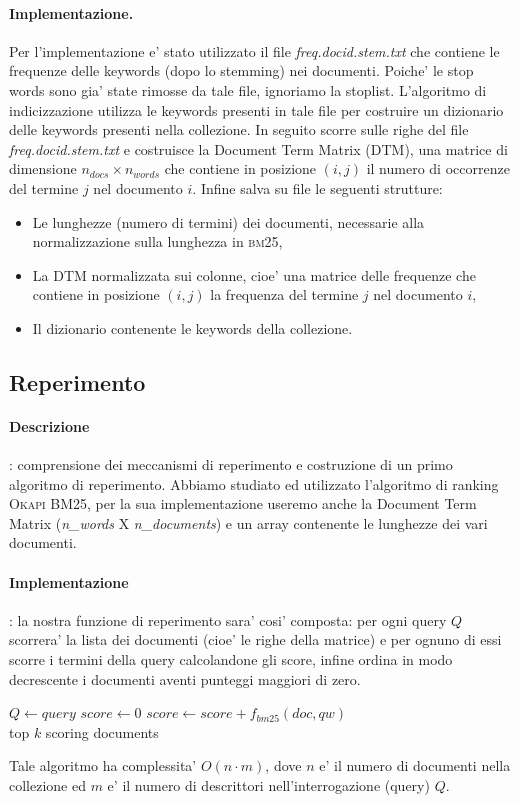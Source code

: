 \paragraph{\textbf{Implementazione.}}
Per l'implementazione e' stato utilizzato il file \textit{freq.docid.stem.txt} che contiene le frequenze delle keywords (dopo lo stemming) nei documenti. Poiche' le stop words sono gia' state rimosse da tale file, ignoriamo la stoplist.
L'algoritmo di indicizzazione utilizza le keywords presenti in tale file per costruire un dizionario delle keywords presenti nella collezione. In seguito scorre sulle righe del file \textit{freq.docid.stem.txt} e costruisce la Document Term Matrix (DTM), una matrice di  dimensione $n_{docs} \times n_{words}$ che contiene in posizione $(i,j)$ il numero di occorrenze del termine $j$ nel documento $i$. Infine salva su file le seguenti strutture:
\begin{itemize}
	\item Le lunghezze (numero di termini) dei documenti, necessarie alla normalizzazione sulla lunghezza in \textsc{bm25},
	\item La DTM normalizzata sui colonne, cioe' una matrice delle frequenze che contiene in posizione $(i,j)$ la frequenza del termine $j$ nel documento $i$,
	\item Il dizionario contenente le keywords della collezione.
\end{itemize}

\subsection{Reperimento}
\label{sec:metodi-di-reper}

\paragraph{\textbf{Descrizione}}: comprensione dei meccanismi di reperimento e costruzione di un primo algoritmo di reperimento.
Abbiamo studiato ed utilizzato l'algoritmo di ranking \textsc{Okapi BM25}, per la sua implementazione useremo anche la Document Term Matrix (\textit{n\_words} X \textit{n\_documents}) e un array contenente le lunghezze dei vari documenti.

\paragraph{\textbf{Implementazione}}: la nostra funzione di reperimento sara' cosi' composta: per ogni query $Q$ scorrera' la lista dei documenti (cioe' le righe della matrice) e per ognuno di essi scorre i termini della query calcolandone gli score, infine ordina in modo decrescente i documenti aventi punteggi maggiori di zero.
\begin{algorithmic}
\State $Q \gets query$
    \State $score\gets 0$
        \State $score \gets score + f_{bm25}(doc, qw)$
    \EndFor
\EndFor\\
\Return top $k$ scoring documents
\end{algorithmic}
Tale algoritmo ha complessita' $O(n \cdot m)$, dove $n$ e' il numero di documenti nella collezione ed $m$ e' il numero di descrittori nell'interrogazione (query) $Q$.


